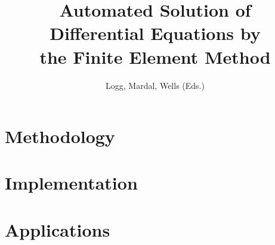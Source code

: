 \documentclass[a4paper]{layout/fenicsbooktest}
\title{Automated Solution of \\
       Differential Equations by \\
       the Finite Element Method}
\author{Logg, Mardal, Wells (Eds.)}
\begin{document}

\maketitle

%


\tableofcontents




%
%




\part{Methodology}


\part{Implementation}


\part{Applications}
\end{document}
